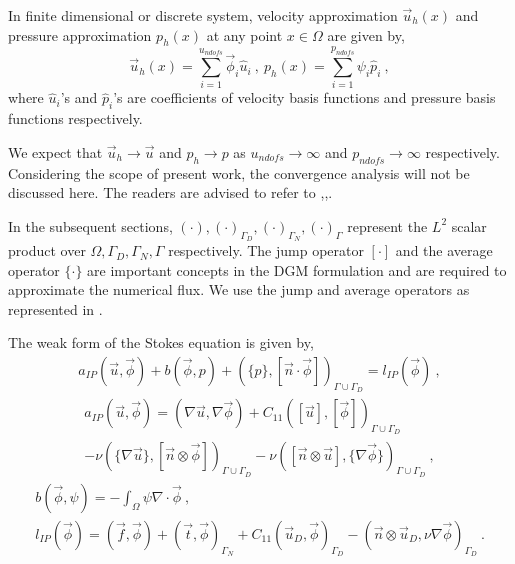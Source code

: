 \documentclass[graybox]{svmult}
\begin{document}
In finite dimensional or discrete system, velocity approximation $\overrightarrow{u}_h(x)$ and pressure approximation $p_h(x)$ at any point $x \in \Omega$ are given by,
\begin{equation}\label{velocity_pressure_coefficients}
\overrightarrow{u}_h(x) = \sum\limits_{i=1}^{u_{ndofs}} \overrightarrow{\phi}_i \hat{u}_i \ , \
p_h(x) = \sum\limits_{i=1}^{p_{ndofs}} \psi_i \hat{p}_i \ ,
\end{equation}
where $\hat{u}_i$'s and $\hat{p}_i$'s are coefficients of velocity basis functions and pressure basis functions respectively. 

We expect that $\overrightarrow{u}_h \rightarrow \overrightarrow{u}$ and $p_h \rightarrow p$ as $u_{ndofs} \rightarrow \infty$ and $p_{ndofs} \rightarrow \infty$ respectively. Considering the scope of present work, the convergence analysis will not be discussed here. The readers are advised to refer to \cite{pacciarini},\cite{jump_mean_operator},\cite{riviere}.

In the subsequent sections, $\left( \cdot \right),\left( \cdot \right)_{\Gamma_D},\left( \cdot \right)_{\Gamma_N},\left( \cdot \right)_{\Gamma}$ represent the $L^2$ scalar product over $\Omega,\Gamma_D,\Gamma_N,\Gamma$ respectively. The jump operator $\left[ \cdot \right]$ and the average operator $\lbrace \cdot \rbrace$ are important concepts in the DGM formulation and are required to approximate the numerical flux. We use the jump and average operators as represented in \cite{jump_mean_operator}.

The weak form of the Stokes equation is given by,
\begin{gather}\label{stokes_weak_ch3}
a_{IP}(\overrightarrow{u},\overrightarrow{\phi}) + b(\overrightarrow{\phi},p) + \left( \lbrace p \rbrace,[\overrightarrow{n} \cdot \overrightarrow{\phi}] \right)_{\Gamma \cup \Gamma_D} = l_{IP}(\overrightarrow{\phi}) \ ,
\end{gather}
\begin{equation}
\begin{split}
a_{IP}(\overrightarrow{u},\overrightarrow{\phi}) = \left( \nabla \overrightarrow{u}, \nabla \overrightarrow{\phi} \right) + C_{11} \left( [\overrightarrow{u}],[\overrightarrow{\phi}] \right)_{\Gamma \cup \Gamma_D} \\ - \nu \left( \lbrace \nabla \overrightarrow{u}\rbrace ,[\overrightarrow{n} \otimes \overrightarrow{\phi}] \right)_{\Gamma \cup \Gamma_D} - \nu \left( [\overrightarrow{n} \otimes \overrightarrow{u}], \lbrace \nabla \overrightarrow{\phi} \rbrace \right)_{\Gamma \cup \Gamma_D} \ ,
\end{split}
\end{equation}
\begin{gather}
b(\overrightarrow{\phi},\psi) = -\int_{\Omega} \psi \nabla \cdot \overrightarrow{\phi} \ , \\
l_{IP}(\overrightarrow{\phi}) = \left( \overrightarrow{f},\overrightarrow{\phi} \right) + \left( \overrightarrow{t},\overrightarrow{\phi} \right)_{\Gamma_N} + C_{11} \left(\overrightarrow{u}_D,\overrightarrow{\phi}\right)_{\Gamma_D} - \left( \overrightarrow{n} \otimes \overrightarrow{u}_D, \nu \nabla \overrightarrow{\phi} \right)_{\Gamma_D} \ .
\end{gather}
\end{document}
